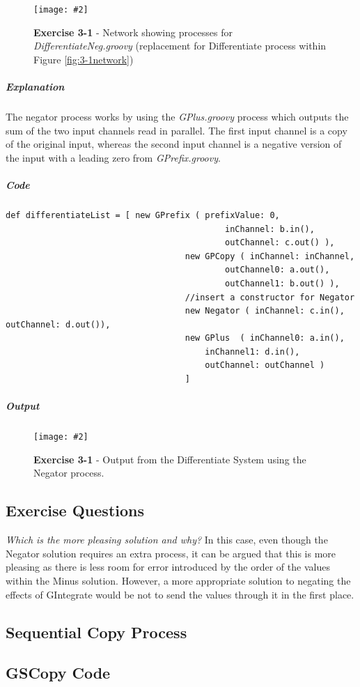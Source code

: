 \documentclass[10pt, a4paper]{article}
\newcommand{\figuremacro}[5]{
    \begin{figure}[#1]
        \centering
        \texttt{[image: \#2]}
        \caption[#3]{\textbf{#3}#4}
        \label{fig:#2}
    \end{figure}
}
\begin{document}
	\figuremacro{H}{negNetwork}{Exercise 3-1}{ - Network showing processes for \textit{DifferentiateNeg.groovy} (replacement for Differentiate process within Figure \ref{fig:3-1network})}{1.0}
	
	\subparagraph{Explanation}
	The negator process works by using the \textit{GPlus.groovy} process which outputs the sum of the two input channels read in parallel. The first input channel is a copy of the original input, whereas the second input channel is a negative version of the input with a leading zero from \textit{GPrefix.groovy}. 
	
	\subparagraph{Code}\hfill
	
	\begin{lstlisting}[caption = "DifferentiateNeg.groovy" ]
	def differentiateList = [ new GPrefix ( prefixValue: 0, 
											inChannel: b.in(), 
											outChannel: c.out() ),
									new GPCopy ( inChannel: inChannel,  
											outChannel0: a.out(), 
											outChannel1: b.out() ),
									//insert a constructor for Negator
									new Negator ( inChannel: c.in(), outChannel: d.out()),		   
									new GPlus  ( inChannel0: a.in(), 
										inChannel1: d.in(), 
										outChannel: outChannel ) 
									]	\end{lstlisting}
	
	\subparagraph{Output} \hfill
	
	\figuremacro{H}{output3-1neg}{Exercise 3-1}{ - Output from the Differentiate System using the Negator process.}{0.2}
	
	\subsection*{Exercise Questions}
	
	\textit{Which is the more pleasing solution and why?}
	In this case, even though the Negator solution requires an extra process, it can be argued that this is more pleasing as there is less room for error introduced by the order of the values within the Minus solution. However, a more appropriate solution to negating the effects of GIntegrate would be not to send the values through it in the first place.

	\subsection{Sequential Copy Process}
	\hfill
	\subsection*{GSCopy Code}
	
\end{document}

